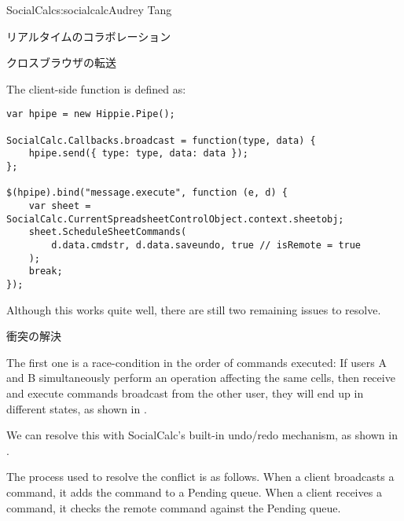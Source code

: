 \begin{aosachapter}{SocialCalc}{s:socialcalc}{Audrey Tang}
\begin{aosasect1}{リアルタイムのコラボレーション}
\begin{aosasect2}{クロスブラウザの転送}

\pagebreak

The client-side  function is
defined as:

\begin{verbatim}
var hpipe = new Hippie.Pipe();

SocialCalc.Callbacks.broadcast = function(type, data) {
    hpipe.send({ type: type, data: data });
};

$(hpipe).bind("message.execute", function (e, d) {
    var sheet = SocialCalc.CurrentSpreadsheetControlObject.context.sheetobj;
    sheet.ScheduleSheetCommands(
        d.data.cmdstr, d.data.saveundo, true // isRemote = true
    );
    break;
});
\end{verbatim}

\noindent Although this works quite well, there are still two remaining issues
to resolve.

\end{aosasect2}

\begin{aosasect2}{衝突の解決}

The first one is a race-condition in the order of commands executed:
If users A and B simultaneously perform an operation affecting the
same cells, then receive and execute commands broadcast from the other
user, they will end up in different states, as shown in
.


We can resolve this with SocialCalc's built-in undo/redo mechanism, as
shown in .


The process used to resolve the conflict is as follows.  When a client
broadcasts a command, it adds the command to a Pending queue.  When a client
receives a command, it checks the remote command against the Pending queue.


\end{aosasect2}
\end{aosasect1}
\end{aosachapter}
